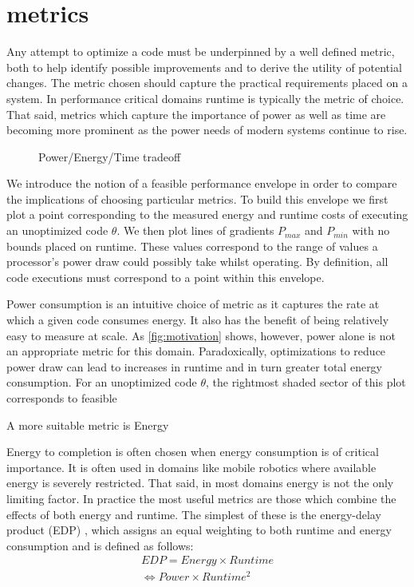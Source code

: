 \section{metrics}

Any attempt to optimize a code must be underpinned by a well defined metric, both to help identify possible improvements and to derive the utility of potential changes. The metric chosen should capture the practical requirements placed on a system. In performance critical domains runtime is typically the metric of choice. That said, metrics which capture the importance of power as well as time are becoming more prominent as the power needs of modern systems continue to rise.

\begin{figure}
\centering

\caption{Power/Energy/Time tradeoff}
\label{fig:motivation}
\end{figure}

We introduce the notion of a feasible performance envelope in order to compare the implications of choosing particular metrics.
To build this envelope we first plot a point corresponding to the measured energy and runtime costs of executing an unoptimized code $\theta$. We then plot lines of gradients $P_{max}$ and $P_{min}$ with no bounds placed on runtime. These values correspond to the range of values a processor's power draw could possibly take whilst operating. By definition, all code executions must correspond to a point within this envelope.

Power consumption is an intuitive choice of metric as it captures the rate at which a given code consumes energy. It also has the benefit of being relatively easy to measure at scale. As \autoref{fig:motivation} shows, however, power alone is not an appropriate metric for this domain. Paradoxically, optimizations to reduce power draw can lead to increases in runtime and in turn greater total energy consumption. For an unoptimized code $\theta$, the rightmost shaded sector of this plot corresponds to feasible  



A more suitable metric is Energy 




Energy to completion is often chosen when energy consumption is of critical importance. It is often used in domains like mobile robotics where available energy is severely restricted. That said, in most domains energy is not the only limiting factor. In practice the most useful metrics are those which combine the effects of both energy and runtime. The simplest of these is the energy-delay product (EDP) \cite{gonzales:1995aa}, which assigns an equal weighting to both runtime and energy consumption and is defined as follows:
\begin{align}
  EDP = Energy \times Runtime \nonumber \\
      \Leftrightarrow Power \times Runtime^{2} 
  \label{eq:edp}
\end{align}

